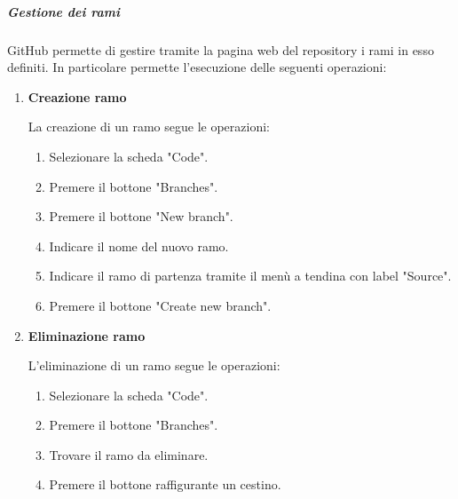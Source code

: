 \subparagraph{Gestione dei rami}
GitHub permette di gestire tramite la pagina web del repository i rami in esso definiti.
In particolare permette l'esecuzione delle seguenti operazioni:
\begin{enumerate}
    \item \textbf{Creazione ramo}
    
    La creazione di un ramo segue le operazioni:
    \begin{enumerate}
        \item Selezionare la scheda "Code".
        \item Premere il bottone "Branches".
        \item Premere il bottone "New branch".
        \item Indicare il nome del nuovo ramo.
        \item Indicare il ramo di partenza tramite il menù a tendina con label "Source".
        \item Premere il bottone "Create new branch".
    \end{enumerate}

    \item \textbf{Eliminazione ramo}
    
    L'eliminazione di un ramo segue le operazioni:
    \begin{enumerate}
        \item Selezionare la scheda "Code".
        \item Premere il bottone "Branches".
        \item Trovare il ramo da eliminare.
        \item Premere il bottone raffigurante un cestino.
    \end{enumerate}

\end{enumerate}

